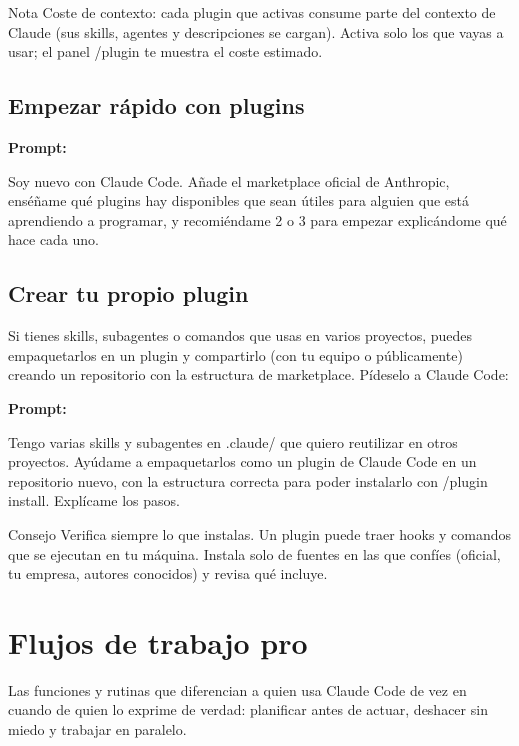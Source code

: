 \documentclass[11pt,a4paper]{report}
\begin{document}
\begin{calloutbox}{Nota}
Coste de contexto: cada plugin que activas consume parte del contexto de Claude (sus skills, agentes y descripciones se cargan). Activa solo los que vayas a usar; el panel /plugin te muestra el coste estimado.\end{calloutbox}

\section{Empezar rápido con plugins}

\noindent\textbf{Prompt: }
\begin{codebox}
Soy nuevo con Claude Code. Añade el marketplace oficial de Anthropic, enséñame qué plugins hay disponibles que sean útiles para alguien que está aprendiendo a programar, y recomiéndame 2 o 3 para empezar explicándome qué hace cada uno.
\end{codebox}

\section{Crear tu propio plugin}

Si tienes skills, subagentes o comandos que usas en varios proyectos, puedes empaquetarlos en un plugin y compartirlo (con tu equipo o públicamente) creando un repositorio con la estructura de marketplace. Pídeselo a Claude Code:

\noindent\textbf{Prompt: }
\begin{codebox}
Tengo varias skills y subagentes en .claude/ que quiero reutilizar en otros proyectos. Ayúdame a empaquetarlos como un plugin de Claude Code en un repositorio nuevo, con la estructura correcta para poder instalarlo con /plugin install. Explícame los pasos.
\end{codebox}

\begin{calloutbox}{Consejo}
Verifica siempre lo que instalas. Un plugin puede traer hooks y comandos que se ejecutan en tu máquina. Instala solo de fuentes en las que confíes (oficial, tu empresa, autores conocidos) y revisa qué incluye.\end{calloutbox}


\chapter{Flujos de trabajo pro}

Las funciones y rutinas que diferencian a quien usa Claude Code de vez en cuando de quien lo exprime de verdad: planificar antes de actuar, deshacer sin miedo y trabajar en paralelo.
\end{document}
